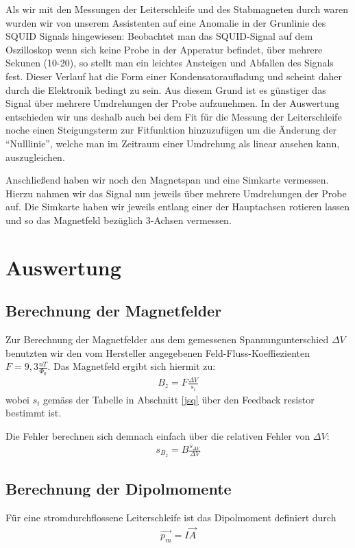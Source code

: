 \documentclass[12pt]{article}
\begin{document}
Als wir mit den Messungen der Leiterschleife und des Stabmagneten durch waren wurden wir von unserem Assistenten auf eine Anomalie in der Grunlinie des SQUID Signals hingewiesen: Beobachtet man das SQUID-Signal auf dem Oszilloskop wenn sich keine Probe in der Apperatur befindet, über mehrere Sekunen (10-20), so stellt man ein leichtes Ansteigen und Abfallen des Signals fest. Dieser Verlauf hat die Form einer Kondensatoraufladung und scheint daher durch die Elektronik bedingt zu sein. Aus diesem Grund ist es günstiger das Signal über mehrere Umdrehungen der Probe aufzunehmen. In der Auswertung entschieden wir uns deshalb auch bei dem Fit für die Messung der Leiterschleife noche einen Steigungsterm zur Fitfunktion hinzuzufügen um die Änderung der "`Nulllinie"', welche man im Zeitraum einer Umdrehung als linear ansehen kann, auszugleichen.

Anschließend haben wir noch den Magnetspan und eine Simkarte vermessen. Hierzu nahmen wir das Signal nun jeweils über mehrere Umdrehungen der Probe auf.
Die Simkarte haben wir jeweils entlang einer der Hauptachsen rotieren lassen und so das Magnetfeld bezüglich 3-Achsen vermessen.
\section{Auswertung}
\subsection{Berechnung der Magnetfelder}
Zur Berechnung der Magnetfelder aus dem gemessenen Spannungunterschied $\varDelta V$ benutzten wir den vom Hersteller angegebenen Feld-Fluss-Koeffiezienten $F=9,3 \frac{nT}{\Phi_0}$. Das Magnetfeld ergibt sich hiermit zu:
\begin{align}
 B_z=F \frac{\varDelta V}{s_i}
\end{align}
wobei $s_i$ gemäss der Tabelle in Abschnitt \ref{jsq} über den Feedback resistor bestimmt ist.

Die Fehler berechnen sich demnach einfach über die relativen Fehler von $\varDelta V$:
\begin{align}
 s_{B_z} = B \frac{s_{\varDelta V}}{\varDelta V}
\end{align}
\subsection{Berechnung der Dipolmomente}
Für eine stromdurchflossene Leiterschleife ist das Dipolmoment definiert durch
\begin{align}
 \vec{p_m}=I \vec{A}
\end{align}
\end{document}
